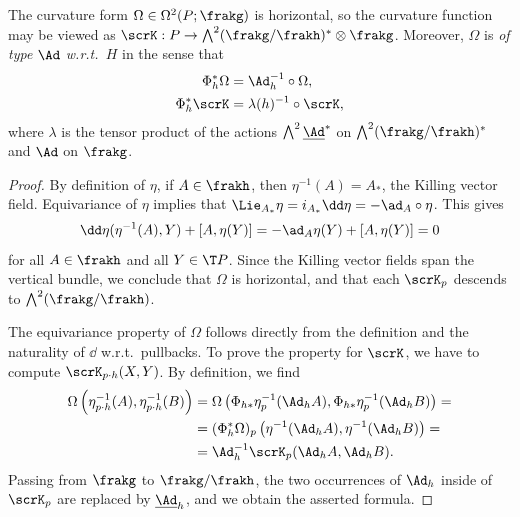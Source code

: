 \begin{lem}\label{lem 1.5.1 Cap}
    The curvature form $\Omega\in\Omega^2(P;\frakg)$ is horizontal, so the curvature function may be viewed as $\scrK:P\to \bigwedge^2(\frakg\slash\frakh)^\ast\otimes\frakg$. Moreover, $\Omega$ is \emph{of type $\Ad$ w.r.t.\ $H$} in the sense that 
    \begin{align}
        \Phi_h^\ast \Omega&=\Ad_h^{-1}\circ \Omega,\\
        \Phi_h^\ast\scrK&=\lambda(h)^{-1}\circ\scrK,
    \end{align}
    where $\lambda$ is the tensor product of the actions $\bigwedge^2 \underline{\Ad}^\ast$ on $\bigwedge^2(\frakg\slash\frakh)^\ast$ and $\Ad$ on $\frakg$.
\end{lem}
\begin{proof}
    By definition of $\eta$, if $A\in\frakh$, then $\eta^{-1}(A)=A_\ast$, the Killing vector field. Equivariance of $\eta$ implies that $\Lie_{A_\ast}\eta=i_{A_\ast}\dd\eta=-\ad_A\circ\eta$. This gives 
    \[\dd\eta(\eta^{-1}(A),Y)+[A,\eta(Y)]=-\ad_{A}\eta(Y)+[A,\eta(Y)]=0\]
    for all $A\in\frakh$ and all $Y\in \T P$. Since the Killing vector fields span the vertical bundle, we conclude that $\Omega$ is horizontal, and that each $\scrK_p$ descends to $\bigwedge^2(\frakg\slash\frakh)$.
    
    The equivariance property of $\Omega$ follows directly from the definition and the naturality of $\dd$ w.r.t.\ pullbacks. To prove the property for $\scrK$, we have to compute $\scrK_{p\cdot h}(X,Y)$. By definition, we find 
    \begin{align}
        \Omega\left(\eta_{p\cdot h}^{-1}(A),\eta_{p\cdot h}^{-1}(B)\right)&=\Omega\left(\Phi_{h\ast}\eta^{-1}_p(\Ad_h A),\Phi_{h\ast}\eta^{-1}_p(\Ad_h B)\right)=\notag\\
        &=(\Phi_h^\ast \Omega)_p \left(\eta^{-1}(\Ad_h A),\eta^{-1}(\Ad_h B)\right)=\notag\\
        &=\Ad_h^{-1}\scrK_p(\Ad_h A,\Ad_h B).
    \end{align}
    Passing from $\frakg$ to $\frakg\slash\frakh$, the two occurrences of $\Ad_h$ inside of $\scrK_p$ are replaced by $\underline{\Ad}_h$, and we obtain the asserted formula.
\end{proof}



